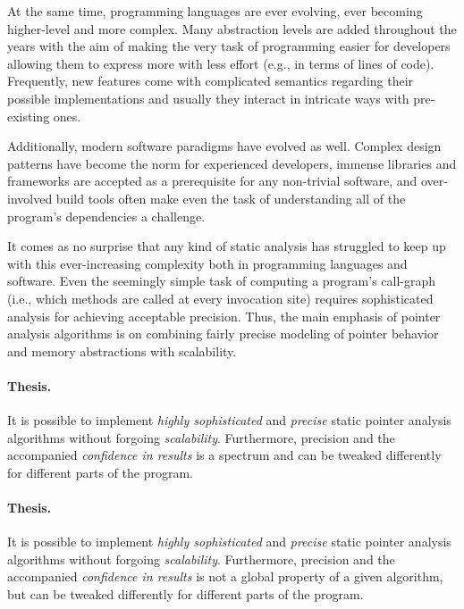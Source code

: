 At the same time, programming languages are ever evolving, ever becoming
higher-level and more complex. Many abstraction levels are added throughout the
years with the aim of making the very task of programming easier for developers
allowing them to express more with less effort (e.g., in terms of lines of
code). Frequently, new features come with complicated semantics regarding their
possible implementations and usually they interact in intricate ways with
pre-existing ones.

Additionally, modern software paradigms have evolved as well. Complex design
patterns have become the norm for experienced developers, immense libraries and
frameworks are accepted as a prerequisite for any non-trivial software, and
over-involved build tools often make even the task of understanding all of the
program's dependencies a challenge.

It comes as no surprise that any kind of static analysis has struggled to keep
up with this ever-increasing complexity both in programming languages and
software. Even the seemingly simple task of computing a program's call-graph
(i.e., which methods are called at every invocation site) requires
sophisticated analysis for achieving acceptable precision. Thus, the main
emphasis of pointer analysis algorithms is on combining fairly precise modeling
of pointer behavior and memory abstractions with scalability.

\paragraph*{Thesis.}
\begin{displayquote}
It is possible to implement \emph{highly sophisticated} and \emph{precise}
	static pointer analysis algorithms without forgoing \emph{scalability}.
	Furthermore, precision and the accompanied \emph{confidence in results} is
	a spectrum and can be tweaked differently for different parts of the
	program.
\end{displayquote}

\paragraph*{Thesis.}
\begin{displayquote}
It is possible to implement \emph{highly sophisticated} and \emph{precise}
	static pointer analysis algorithms without forgoing \emph{scalability}.
	Furthermore, precision and the accompanied \emph{confidence in results} is not a global property of a given algorithm, but can be tweaked differently for different parts of the
	program.
\end{displayquote}

